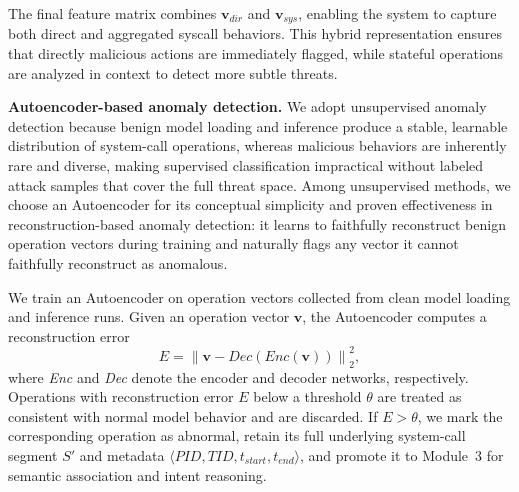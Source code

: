 The final feature matrix combines $\mathbf{v}_{\textit{dir}}$ and $\mathbf{v}_{\textit{sys}}$, enabling the system to capture both direct and aggregated syscall behaviors. This hybrid representation ensures that directly malicious actions are immediately flagged, while stateful operations are analyzed in context to detect more subtle threats.


\noindent \textbf{Autoencoder-based anomaly detection.} We adopt unsupervised anomaly detection because benign model loading and inference produce a stable, learnable distribution of system-call operations, whereas malicious behaviors are inherently rare and diverse, making supervised classification impractical without labeled attack samples that cover the full threat space. Among unsupervised methods, we choose an Autoencoder for its conceptual simplicity and proven effectiveness in reconstruction-based anomaly detection: it learns to faithfully reconstruct benign operation vectors during training and naturally flags any vector it cannot faithfully reconstruct as anomalous.

We train an Autoencoder on operation vectors collected from clean model loading and inference runs. Given an operation vector $\mathbf{v}$, the Autoencoder computes a reconstruction error
\begin{equation}
E = \left\lVert \mathbf{v} - \textit{Dec}(\textit{Enc}(\mathbf{v})) \right\rVert_2^2,
\end{equation}
where \textit{Enc} and \textit{Dec} denote the encoder and decoder networks, respectively. Operations with reconstruction error $E$ below a threshold $\theta$ are treated as consistent with normal model behavior and are discarded. If $E > \theta$, we mark the corresponding operation as abnormal, retain its full underlying system-call segment $S'$ and metadata $\langle \textit{PID}, \textit{TID}, t_{\textit{start}}, t_{\textit{end}} \rangle$, and promote it to Module~3 for semantic association and intent reasoning.


